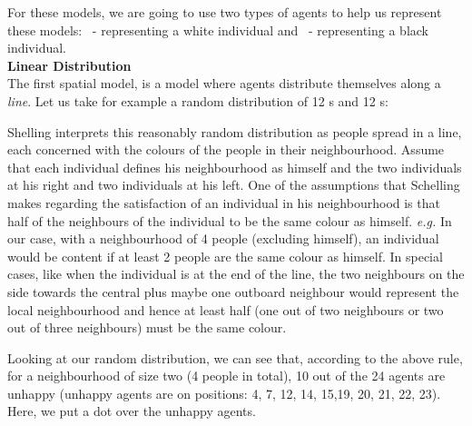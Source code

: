 \documentclass[../main.tex]{subfiles}
\begin{document}
For these models, we are going to use two types of agents to help us represent these models: \z\ - representing a white individual and \x\ - representing a black individual.\\

\textbf{Linear Distribution} \\
The first spatial model, is a model where agents distribute themselves along a \textit{line}. Let us take for example a random distribution of 12 \z s and 12 \x s:

\begin{table}[H]
\begin{center}
\end{center}
\caption*{Random Linear distribution - 12 whites and 12 blacks} 
\end{table}

Shelling interprets this reasonably random distribution as people spread in a line, each concerned with the colours of the people in their neighbourhood. Assume that each individual defines his neighbourhood as himself and the two individuals at his right and two individuals at his left. One of the assumptions that Schelling makes regarding the satisfaction of an individual in his neighbourhood is that half of the neighbours of the individual to be the same colour as himself. \textit{e.g.} In our case, with a neighbourhood of 4 people (excluding himself), an individual would be content if at least 2 people are the same colour as himself. In special cases, like when the individual is at the end of the line, the two neighbours on the side towards the central plus maybe one outboard neighbour would represent the local neighbourhood and hence at least half (one out of two neighbours or two out of three neighbours) must be the same colour.

Looking at our random distribution, we can see that, according to the above rule, for a neighbourhood of size two (4 people in total), 10 out of the 24 agents are unhappy (unhappy agents are on positions: 4, 7, 12, 14, 15,19, 20, 21, 22, 23). Here, we put a dot over the unhappy agents.
\end{document}
